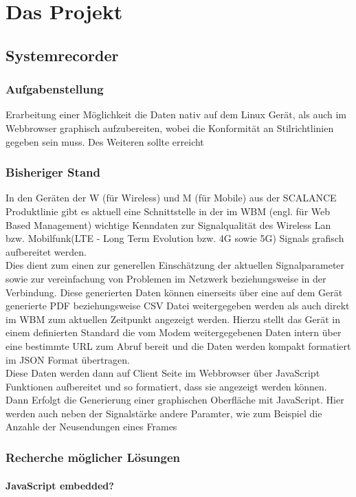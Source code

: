 \chapter{Das Projekt}

\section{Systemrecorder}
\subsection{Aufgabenstellung}
Erarbeitung einer Möglichkeit die Daten nativ auf dem Linux Gerät, als auch im Webbrowser graphisch aufzubereiten, wobei die Konformität an Stilrichtlinien gegeben sein muss.
Des Weiteren sollte erreicht 
\subsection{Bisheriger Stand}
In den Geräten der W (für Wireless) und M (für Mobile) aus der SCALANCE Produktlinie gibt es aktuell eine Schnittstelle in der im WBM (engl. für Web Based Management) wichtige Kenndaten zur Signalqualität des Wireless Lan bzw. Mobilfunk(LTE - Long Term Evolution bzw. 4G sowie 5G) Signals grafisch aufbereitet werden. \\
Dies dient zum einen zur generellen Einschätzung der aktuellen Signalparameter sowie zur vereinfachung von Problemen im Netzwerk beziehungsweise in der Verbindung. Diese generierten Daten 
können einerseits über eine auf dem Gerät generierte PDF beziehungsweise CSV Datei weitergegeben werden als auch direkt im WBM zum aktuellen Zeitpunkt angezeigt werden. Hierzu stellt das Gerät 
in einem definierten Standard die vom Modem weitergegebenen Daten intern über eine bestimmte URL zum Abruf bereit und die Daten werden kompakt formatiert im JSON Format übertragen. \\
Diese Daten werden dann auf Client Seite im Webbrowser über JavaScript Funktionen aufbereitet und so formatiert, dass sie angezeigt werden können. Dann Erfolgt die Generierung einer graphischen Oberfläche
mit JavaScript. Hier werden auch neben der Signalstärke andere Paramter, wie zum Beispiel die Anzahle der Neusendungen eines Frames 
\subsection{Recherche möglicher Lösungen}
\subsubsection{JavaScript embedded?}
